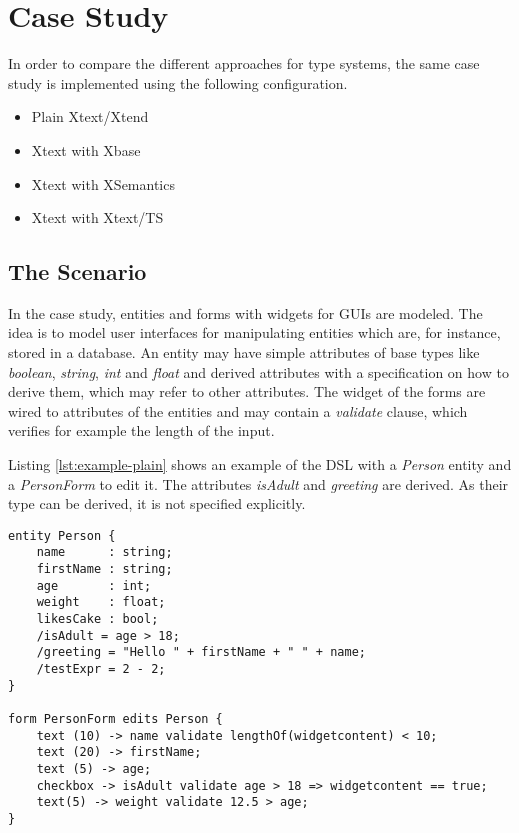 \section{Case Study}

In order to compare the different approaches for type systems, the same case study is implemented using the following configuration.

\begin{itemize}
\item Plain Xtext/Xtend
\item Xtext with Xbase
\item Xtext with XSemantics
\item Xtext with Xtext/TS
\end{itemize}

\subsection{The Scenario}
In the case study, entities and forms with widgets for GUIs are modeled. The idea is to model user interfaces for manipulating entities which are, for instance, stored in a database. An entity may have simple attributes of base types like \emph{boolean}, \emph{string}, \emph{int} and \emph{float} and derived attributes with a specification on how to derive them, which may refer to other attributes. The widget of the forms are wired to attributes of the entities and may contain a \emph{validate} clause, which verifies for example the length of the input.

Listing \ref{lst:example-plain} shows an example of the DSL with a \emph{Person} entity and a \emph{PersonForm} to edit it. The attributes \emph{isAdult} and \emph{greeting} are derived. As their type can be derived, it is not specified explicitly.

%

\begin{lstlisting}[language=guidsl,float,label=lst:example-plain,caption=Forms
and Entities DSL] 
entity Person {
	name      : string;
	firstName : string;
	age       : int; 
	weight    : float;
	likesCake : bool; 
	/isAdult = age > 18;
	/greeting = "Hello " + firstName + " " + name;
	/testExpr = 2 - 2;
}

form PersonForm edits Person {
	text (10) -> name validate lengthOf(widgetcontent) < 10;
	text (20) -> firstName;
	text (5) -> age;
	checkbox -> isAdult validate age > 18 => widgetcontent == true;
	text(5) -> weight validate 12.5 > age;
}
\end{lstlisting}


